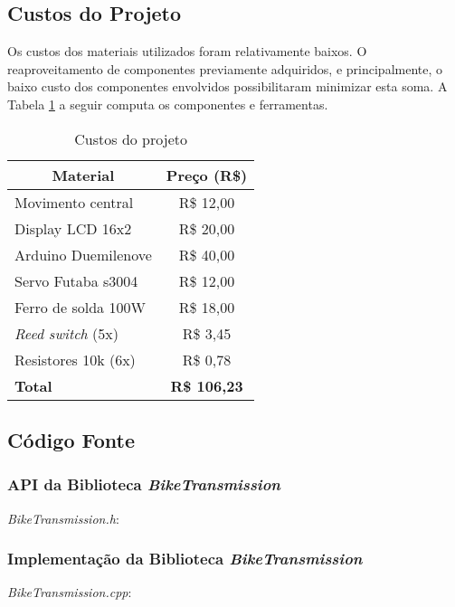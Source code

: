 \documentclass[a4paper,11pt]{article}
\begin{document}
\subsection{Custos do Projeto}
\label{custos}
Os custos dos materiais utilizados foram relativamente baixos. O
reaproveitamento de componentes previamente adquiridos, e principalmente, o
baixo custo dos componentes envolvidos possibilitaram minimizar esta soma. A
Tabela \ref{tab:custos} a seguir computa os componentes e ferramentas.
{
\newcommand{\mc}[3]{\multicolumn{#1}{#2}{#3}}
\begin{table}[ht]
\begin{center}
\caption{Custos do projeto}
\label{tab:custos}
\begin{tabular}{lc}
\mc{1}{c}{\textbf{Material}} & \textbf{Preço (R\$)}\\\hline
Movimento central & R\$ 12,00\\
Display LCD 16x2 & R\$ 20,00\\
Arduino Duemilenove & R\$ 40,00\\
Servo Futaba s3004 & R\$ 12,00\\
Ferro de solda 100W & R\$ 18,00\\
\textit{Reed switch} (5x) & R\$ 3,45\\
Resistores 10k (6x) & R\$ 0,78\\\hline
\textbf{Total} & \textbf{R\$ 106,23}\\\hline
\end{tabular}
\end{center}
\end{table}
}



%
\subsection{Código Fonte}
\label{codigo}

\subsubsection{API da Biblioteca \textit{BikeTransmission}}
\label{code:api}
\textit{BikeTransmission.h}:


\subsubsection{Implementação da Biblioteca \textit{BikeTransmission}}
\label{code:impl}
\textit{BikeTransmission.cpp}:

\end{document}
